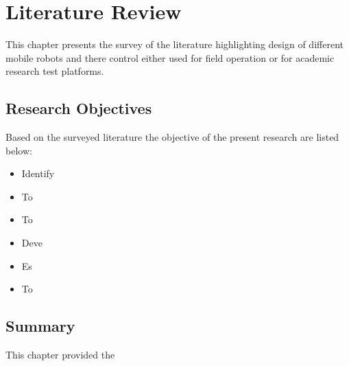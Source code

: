 \setcounter{secnumdepth}{4} 
\chapter{Literature Review}
\label{c2_LitRev}

This chapter presents the survey of the literature highlighting design  of different mobile robots and there  control either used for field operation  or for academic research test platforms. 


\section{Research Objectives}
Based on the surveyed literature the objective of the present research are listed below:

\begin{itemize}

\item Identify 
\item To 
\item To 
\item Deve
\item Es
\item To  

\end{itemize}


\section{Summary}
This chapter provided the 	

